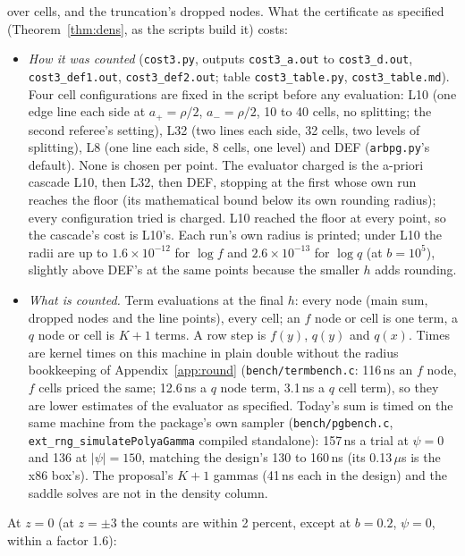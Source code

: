 \begin{enumerate}
over cells, and the truncation's dropped nodes. What the certificate as specified (Theorem~\ref{thm:dens}, as the
scripts build it) costs:
\begin{itemize}
\item \emph{How it was counted} (\texttt{cost3.py}, outputs \texttt{cost3\_a.out} to \texttt{cost3\_d.out},
\texttt{cost3\_def1.out}, \texttt{cost3\_def2.out}; table \texttt{cost3\_table.py}, \texttt{cost3\_table.md}).
Four cell configurations are fixed in the script before any evaluation: L10 (one edge line each side at
$a_+=\rho/2$, $a_-=\rho/2$, 10 to 40 cells, no splitting; the second referee's setting), L32 (two lines each side,
32 cells, two levels of splitting), L8 (one line each side, 8 cells, one level) and DEF (\texttt{arbpg.py}'s
default). None is chosen per point. The evaluator charged is the a-priori cascade L10, then L32, then DEF, stopping
at the first whose own run reaches the floor (its mathematical bound below its own rounding radius); every
configuration tried is charged. L10 reached the floor at every point, so the cascade's cost is L10's. Each run's
own radius is printed; under L10 the radii are up to $1.6\times10^{-12}$ for $\log f$ and $2.6\times10^{-13}$ for
$\log q$ (at $b=10^5$), slightly above DEF's at the same points because the smaller $h$ adds rounding.
\item \emph{What is counted.} Term evaluations at the final $h$: every node (main sum, dropped nodes and the line
points), every cell; an $f$ node or cell is one term, a $q$ node or cell is $K+1$ terms. A row step is $f(y)$,
$q(y)$ and $q(x)$. Times are kernel times on this machine in plain double without the radius bookkeeping of
Appendix~\ref{app:round} (\texttt{bench/termbench.c}: 116\,ns an $f$ node, $f$ cells priced the same; 12.6\,ns a $q$
node term, 3.1\,ns a $q$ cell term), so they are lower estimates of the evaluator as specified. Today's sum is timed
on the same machine from the package's own sampler (\texttt{bench/pgbench.c}, \texttt{ext\_rng\_simulatePolyaGamma}
compiled standalone): 157\,ns a trial at $\psi=0$ and 136 at $|\psi|=150$, matching the design's 130 to 160\,ns
(its 0.13\,$\mu$s is the x86 box's). The proposal's $K+1$ gammas (41\,ns each in the design) and the saddle solves
are not in the density column.
\end{itemize}
At $z=0$ (at $z=\pm3$ the counts are within 2 percent, except at $b=0.2$, $\psi=0$, within a factor 1.6):
\begin{center}\scriptsize\setlength{\tabcolsep}{2pt}\hspace*{-2em}

\end{center}
\end{enumerate}
